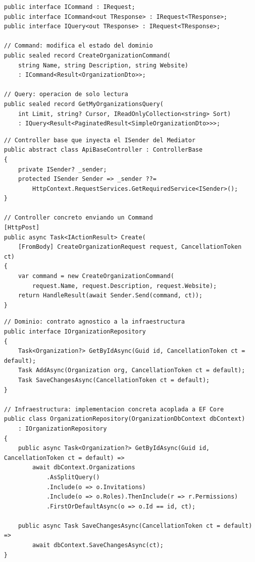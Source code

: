 \begin{lstlisting}[float=htbp, style=CSharp, caption={Definición de interfaces base para CQRS y su aplicación práctica.}, label={lst:cqrs_pattern}]
public interface ICommand : IRequest;
public interface ICommand<out TResponse> : IRequest<TResponse>;
public interface IQuery<out TResponse> : IRequest<TResponse>;

// Command: modifica el estado del dominio
public sealed record CreateOrganizationCommand(
    string Name, string Description, string Website)
    : ICommand<Result<OrganizationDto>>;

// Query: operacion de solo lectura
public sealed record GetMyOrganizationsQuery(
    int Limit, string? Cursor, IReadOnlyCollection<string> Sort)
    : IQuery<Result<PaginatedResult<SimpleOrganizationDto>>>;
\end{lstlisting}

\begin{lstlisting}[float=htbp, style=CSharp, caption={Uso del patrón Mediator para desacoplar controladores de sus manejadores.}, label={lst:mediator_pattern}]
// Controller base que inyecta el ISender del Mediator
public abstract class ApiBaseController : ControllerBase
{
    private ISender? _sender;
    protected ISender Sender => _sender ??= 
        HttpContext.RequestServices.GetRequiredService<ISender>();
}

// Controller concreto enviando un Command
[HttpPost]
public async Task<IActionResult> Create(
    [FromBody] CreateOrganizationRequest request, CancellationToken ct)
{
    var command = new CreateOrganizationCommand(
        request.Name, request.Description, request.Website);
    return HandleResult(await Sender.Send(command, ct));
}
\end{lstlisting}

\begin{lstlisting}[float=htbp, style=CSharp, caption={Separación de contrato e implementación mediante el patrón Repository.}, label={lst:repository_pattern}]
// Dominio: contrato agnostico a la infraestructura
public interface IOrganizationRepository
{
    Task<Organization?> GetByIdAsync(Guid id, CancellationToken ct = default);
    Task AddAsync(Organization org, CancellationToken ct = default);
    Task SaveChangesAsync(CancellationToken ct = default);
}

// Infraestructura: implementacion concreta acoplada a EF Core
public class OrganizationRepository(OrganizationDbContext dbContext) 
    : IOrganizationRepository
{
    public async Task<Organization?> GetByIdAsync(Guid id, CancellationToken ct = default) =>
        await dbContext.Organizations
            .AsSplitQuery()
            .Include(o => o.Invitations)
            .Include(o => o.Roles).ThenInclude(r => r.Permissions)
            .FirstOrDefaultAsync(o => o.Id == id, ct);

    public async Task SaveChangesAsync(CancellationToken ct = default) =>
        await dbContext.SaveChangesAsync(ct);
}
\end{lstlisting}

